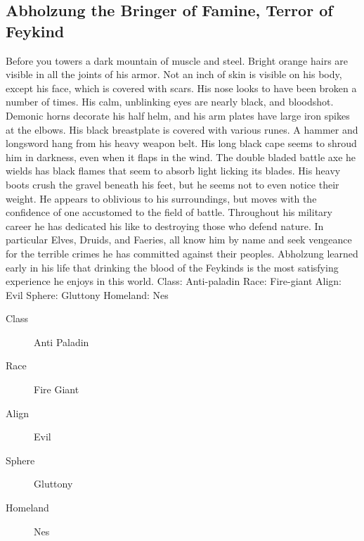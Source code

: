\begin{multicols}{2}
\section{Abholzung the Bringer of Famine, Terror of Feykind}
	Before you towers a dark mountain of muscle and steel. Bright orange hairs are visible in all the joints of his armor. Not an inch of skin is visible on his body, except his face, which is covered with scars. His nose looks to have been broken a number of times. His calm, unblinking eyes are nearly black, and bloodshot. Demonic horns decorate his half helm, and his arm plates have large iron spikes at the elbows. His black breastplate is covered with various runes. A hammer and longsword hang from his heavy weapon belt. His long black cape seems to shroud him in darkness, even when it flaps in the wind. The double bladed battle axe he wields has black flames that seem to absorb light licking its blades. His heavy boots crush the gravel beneath his feet, but he seems not to even notice their weight. He appears to oblivious to his surroundings, but moves with the confidence of one accustomed to the field of battle.
	Throughout his military career he has dedicated his like to destroying those who defend nature. In particular Elves, Druids, and Faeries, all know him by name and seek vengeance for the terrible crimes he has committed against their peoples. Abholzung learned early in his life that drinking the blood of the Feykinds is the most satisfying experience he enjoys in this world. 
Class: Anti-paladin
Race: Fire-giant
Align: Evil
Sphere: Gluttony
Homeland: Nes
\begin{description}
  \item[Class] Anti Paladin
  \item[Race] Fire Giant
  \item[Align] Evil
  \item[Sphere] Gluttony
  \item[Homeland] Nes
\end{description}

\end{multicols}
